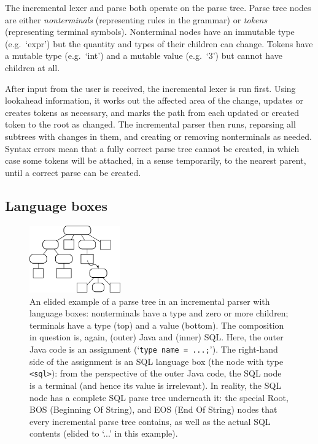 \documentclass[sigplan,screen]{acmart}\settopmatter{printfolios=true,printccs=false,printacmref=false}
\begin{document}
The incremental lexer and parse both operate on the parse tree. Parse tree nodes
are either \emph{nonterminals} (representing rules in the grammar) or
\emph{tokens} (representing terminal symbols). Nonterminal nodes have an
immutable type (e.g.~`expr') but the quantity and types of their children can change.
Tokens have a mutable type (e.g.~`int')
and a mutable value (e.g.~`3') but cannot have children at all.

After input from the user is received, the incremental lexer is run first.
Using lookahead information, it works out the affected area of the change,
updates or creates tokens as necessary, and marks the path from each updated or
created token to the root as changed. The incremental parser then runs,
reparsing all subtrees with changes in them, and creating or removing
nonterminals as needed. Syntax errors mean that a fully correct parse tree
cannot be created, in which case some tokens will be attached, in a sense
temporarily, to the nearest parent, until a correct parse can be created.


\subsection{Language boxes}

\begin{figure}[t]
\begin{center}
\includegraphics[width=0.35\textwidth]{images/lbox_parsetree}
\caption{An elided example of a parse tree in an incremental parser with
  language boxes: nonterminals have a type and zero or more children; terminals
  have a type (top) and a value (bottom). The composition in question is,
  again, (outer) Java and (inner) SQL. Here, the outer Java code is an
  assignment (`\texttt{type name = ...;}'). The right-hand side of the
  assignment is an SQL language box (the node with type \texttt{<sql>}): from the
  perspective of the outer Java code, the SQL node is a terminal (and hence its
  value is irrelevant). In reality, the SQL node has a complete SQL parse tree
  underneath it: the special Root, BOS (Beginning Of String), and EOS (End Of
  String) nodes that every incremental parse tree contains, as well as the actual
  SQL contents (elided to `...' in this example). }
\label{fig:lboxtree}
\end{center}
\end{figure}
\end{document}
